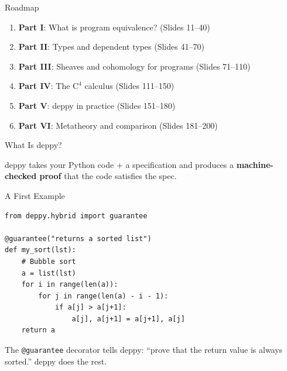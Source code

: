 \documentclass[aspectratio=169,11pt]{beamer}
\newcommand{\Cfour}{\mathrm{C}^4}
\begin{document}
\begin{frame}{Roadmap}
\begin{enumerate}
\item \textbf{Part I}: What is program equivalence? (Slides 11--40)
\item \textbf{Part II}: Types and dependent types (Slides 41--70)
\item \textbf{Part III}: Sheaves and cohomology for programs (Slides 71--110)
\item \textbf{Part IV}: The $\Cfour$ calculus (Slides 111--150)
\item \textbf{Part V}: deppy in practice (Slides 151--180)
\item \textbf{Part VI}: Metatheory and comparison (Slides 181--200)
\end{enumerate}
\end{frame}

\begin{frame}{What Is deppy?}
\begin{center}
\end{center}

deppy takes your Python code + a specification and produces a
\textbf{machine-checked proof} that the code satisfies the spec.
\end{frame}

\begin{frame}[fragile]{A First Example}
\begin{lstlisting}[language=deppy]
from deppy.hybrid import guarantee

@guarantee("returns a sorted list")
def my_sort(lst):
    # Bubble sort
    a = list(lst)
    for i in range(len(a)):
        for j in range(len(a) - i - 1):
            if a[j] > a[j+1]:
                a[j], a[j+1] = a[j+1], a[j]
    return a
\end{lstlisting}

\vspace{0.5em}
The \lstinline|@guarantee| decorator tells deppy: ``prove that the return
value is always sorted.'' deppy does the rest.
\end{frame}
\end{document}
